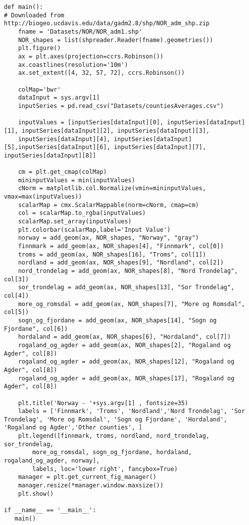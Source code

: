 \begin{lstlisting}
def main():
# Downloaded from http://biogeo.ucdavis.edu/data/gadm2.8/shp/NOR_adm_shp.zip
	fname = 'Datasets/NOR/NOR_adm1.shp'
	NOR_shapes = list(shpreader.Reader(fname).geometries())
	plt.figure()
	ax = plt.axes(projection=ccrs.Robinson())
	ax.coastlines(resolution='10m')
	ax.set_extent([4, 32, 57, 72], ccrs.Robinson())	

	colMap='bwr'
	dataInput = sys.argv[1]
	inputSeries = pd.read_csv("Datasets/countiesAverages.csv")

	inputValues = [inputSeries[dataInput][0], inputSeries[dataInput][1], inputSeries[dataInput][2], inputSeries[dataInput][3],
	inputSeries[dataInput][4], inputSeries[dataInput][5],inputSeries[dataInput][6], inputSeries[dataInput][7], 							inputSeries[dataInput][8]]

	cm = plt.get_cmap(colMap)
	mininputValues = min(inputValues)
	cNorm = matplotlib.col.Normalize(vmin=mininputValues, vmax=max(inputValues))
	scalarMap = cmx.ScalarMappable(norm=cNorm, cmap=cm)	
	col = scalarMap.to_rgba(inputValues)	
	scalarMap.set_array(inputValues)
	plt.colorbar(scalarMap,label='Input Value')
	norway = add_geom(ax, NOR_shapes, "Norway", "gray")
	finnmark = add_geom(ax, NOR_shapes[4], "Finnmark", col[0])
	troms = add_geom(ax, NOR_shapes[16], "Troms", col[1])
	nordland = add_geom(ax, NOR_shapes[9], "Nordland", col[2])
	nord_trondelag = add_geom(ax, NOR_shapes[8], "Nord Trondelag", col[3])
	sor_trondelag = add_geom(ax, NOR_shapes[13], "Sor Trondelag", col[4])
	more_og_romsdal = add_geom(ax, NOR_shapes[7], "More og Romsdal", col[5])
	sogn_og_fjordane = add_geom(ax, NOR_shapes[14], "Sogn og Fjordane", col[6])
	hordaland = add_geom(ax, NOR_shapes[6], "Hordaland", col[7])
	rogaland_og_agder = add_geom(ax, NOR_shapes[2], "Rogaland og Agder", col[8])
	rogaland_og_agder = add_geom(ax, NOR_shapes[12], "Rogaland og Agder", col[8])
	rogaland_og_agder = add_geom(ax, NOR_shapes[17], "Rogaland og Agder", col[8])

	plt.title('Norway - '+sys.argv[1] , fontsize=35)
	labels = ['Finnmark', 'Troms', 'Nordland','Nord Trondelag', 'Sor Trondelag', 'More og Romsdal',	'Sogn og Fjordane', 'Hordaland', 	'Rogaland og Agder','Other counties', ]
	plt.legend([finnmark, troms, nordland, nord_trondelag, sor_trondelag, 
		more_og_romsdal, sogn_og_fjordane, hordaland, rogaland_og_agder, norway], 
		labels, loc='lower right', fancybox=True)
	manager = plt.get_current_fig_manager()
	manager.resize(*manager.window.maxsize())
	plt.show()

if __name__ == '__main__':
   main()
\end{lstlisting}